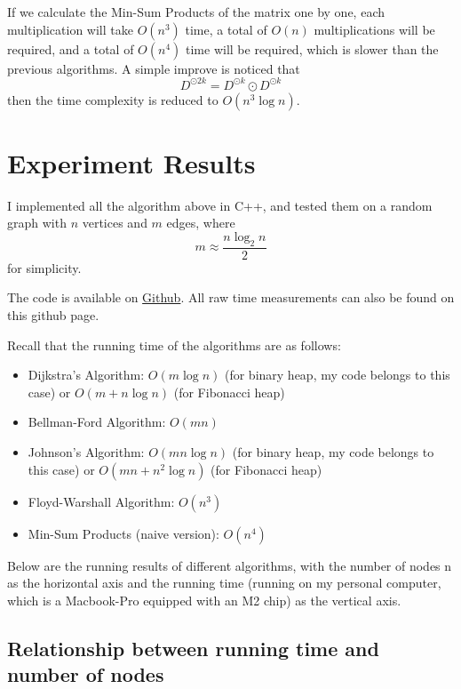 \documentclass[11pt]{article}
\theoremstyle{plain}
\begin{document}
If we calculate the Min-Sum Products of the matrix one by one, each multiplication will take $O(n^3)$ time, 
a total of $O(n)$ multiplications will be required, and a total of $O(n^4)$ time will be required, which is 
slower than the previous algorithms. A simple improve is noticed that 
\[
  D^{\odot 2k} = D^{\odot k}\odot D^{\odot k}
\]
then the time complexity is reduced to $O(n^3 \log n)$.

\section{Experiment Results}

I implemented all the algorithm above in C++, and tested them on a random graph with $n$ vertices and $m$ edges, where 
\[
  m \approx \frac{n \log_2 n}{2}
\]
for simplicity.

The code is available on \href{https://github.com/Integer003/AlgorithmDesign-project}{Github}.
All raw time measurements can also be found on this github page.

Recall that the running time of the algorithms are as follows:
\begin{itemize}
  \item Dijkstra's Algorithm: $O(m \log n)$ (for binary heap, my code belongs to this case) or $O(m + n \log n)$ (for Fibonacci heap)
  \item Bellman-Ford Algorithm: $O(mn)$
  \item Johnson's Algorithm: $O(mn \log n)$ (for binary heap, my code belongs to this case) or $O(mn + n^2 \log n)$ (for Fibonacci heap)
  \item Floyd-Warshall Algorithm: $O(n^3)$
  \item Min-Sum Products (naive version): $O(n^4)$
\end{itemize}

Below are the running results of different algorithms, with the number of nodes n as the 
horizontal axis and the running time (running on my personal computer, which is a Macbook-Pro 
equipped with an M2 chip) as the vertical axis.


\subsection{Relationship between running time and number of nodes}\
\end{document}
